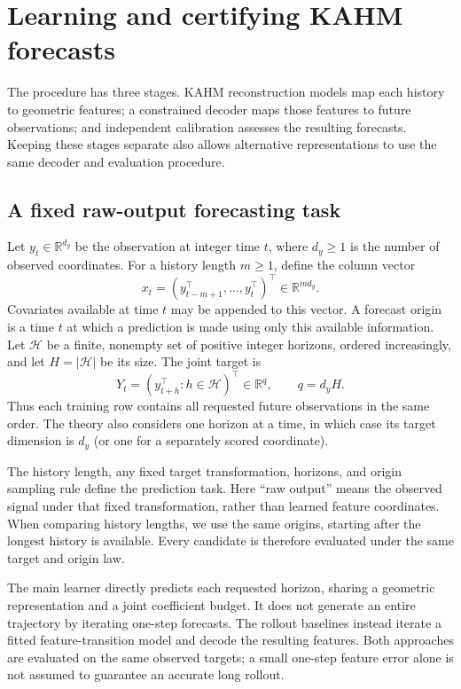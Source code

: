 \section{Learning and certifying KAHM forecasts}
\label{sec:method}

The procedure has three stages. KAHM reconstruction models map each history
to geometric features; a constrained decoder maps those features to future
observations; and independent calibration assesses the resulting forecasts.
Keeping these stages separate also allows alternative representations to use
the same decoder and evaluation procedure.



\subsection{A fixed raw-output forecasting task}

Let $y_t\in\mathbb R^{d_y}$ be the observation at integer time $t$, where
$d_y\geq1$ is the number of observed coordinates. For a history length
$m\geq1$, define the column vector
\[
 x_t=(y_{t-m+1}^\top,\ldots,y_t^\top)^\top\in\mathbb R^{md_y}.
\]
Covariates available at time $t$ may be appended to this vector. A forecast
origin is a time $t$ at which a prediction is made using only this available
information. Let $\mathcal H$ be a finite, nonempty set of positive integer
horizons, ordered increasingly, and let $H=|\mathcal H|$ be its size. The joint
target is
\[
 Y_t=(y_{t+h}^\top:h\in\mathcal H)^\top\in\mathbb R^q,
 \qquad q=d_yH.
\]
Thus each training row contains all requested future observations in the same
order. The theory also considers one horizon at a time, in which case its
target dimension is $d_y$ (or one for a separately scored coordinate).

The history length, any fixed target transformation, horizons, and origin
sampling rule define the prediction task. Here ``raw output'' means the
observed signal under that fixed transformation, rather than learned feature
coordinates. When comparing history lengths, we use the same origins, starting
after the longest history is available. Every candidate is therefore evaluated
under the same target and origin law.

The main learner directly predicts each requested horizon, sharing a geometric
representation and a joint coefficient budget. It does not generate an entire
trajectory by iterating one-step forecasts. The rollout baselines instead
iterate a fitted feature-transition model and decode the resulting features.
Both approaches are evaluated on the same observed targets; a small one-step
feature error alone is not assumed to guarantee an accurate long rollout.

